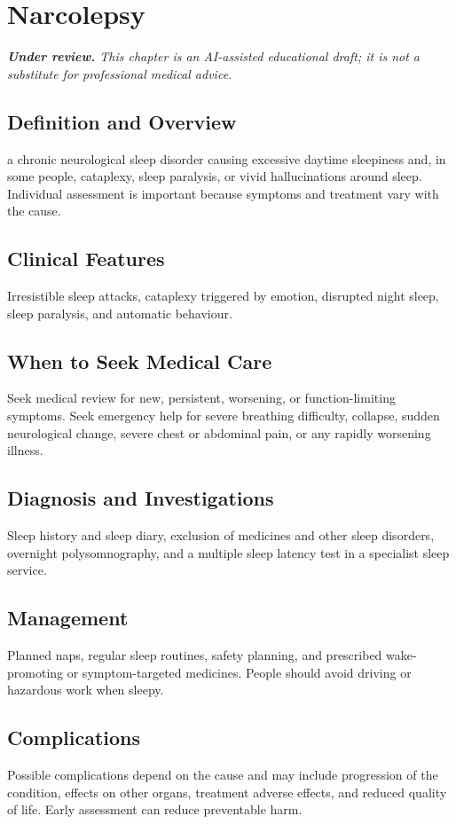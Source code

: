 \chapter{Narcolepsy}

\medskip
\noindent\textit{\textbf{Under review.} This chapter is an AI-assisted educational draft; it is not a substitute for professional medical advice.}

\section*{Definition and Overview}
a chronic neurological sleep disorder causing excessive daytime sleepiness and, in some people, cataplexy, sleep paralysis, or vivid hallucinations around sleep. Individual assessment is important because symptoms and treatment vary with the cause.

\section*{Clinical Features}
Irresistible sleep attacks, cataplexy triggered by emotion, disrupted night sleep, sleep paralysis, and automatic behaviour.

\section*{When to Seek Medical Care}
Seek medical review for new, persistent, worsening, or function-limiting symptoms. Seek emergency help for severe breathing difficulty, collapse, sudden neurological change, severe chest or abdominal pain, or any rapidly worsening illness.

\section*{Diagnosis and Investigations}
Sleep history and sleep diary, exclusion of medicines and other sleep disorders, overnight polysomnography, and a multiple sleep latency test in a specialist sleep service.

\section*{Management}
Planned naps, regular sleep routines, safety planning, and prescribed wake-promoting or symptom-targeted medicines. People should avoid driving or hazardous work when sleepy.

\section*{Complications}
Possible complications depend on the cause and may include progression of the condition, effects on other organs, treatment adverse effects, and reduced quality of life. Early assessment can reduce preventable harm.

